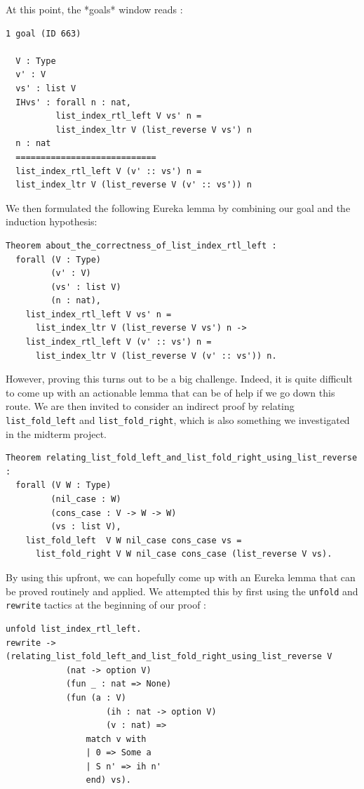 \documentclass{article}
\begin{document}
At this point, the *goals* window reads :

\begin{lstlisting}
1 goal (ID 663)
  
  V : Type
  v' : V
  vs' : list V
  IHvs' : forall n : nat,
          list_index_rtl_left V vs' n =
          list_index_ltr V (list_reverse V vs') n
  n : nat
  ============================
  list_index_rtl_left V (v' :: vs') n =
  list_index_ltr V (list_reverse V (v' :: vs')) n
\end{lstlisting}

We then formulated the following Eureka lemma by combining our goal and the induction hypothesis:

\begin{lstlisting}
Theorem about_the_correctness_of_list_index_rtl_left :
  forall (V : Type)
         (v' : V)
         (vs' : list V)
         (n : nat),
    list_index_rtl_left V vs' n =
      list_index_ltr V (list_reverse V vs') n ->
    list_index_rtl_left V (v' :: vs') n =
      list_index_ltr V (list_reverse V (v' :: vs')) n.
\end{lstlisting}

However, proving this turns out to be a big challenge. Indeed, it is quite difficult to come up with an actionable lemma that can be of help if we go down this route. We are then invited to consider an indirect proof by relating \texttt{list\_fold\_left} and \texttt{list\_fold\_right}, which is also something we investigated in the midterm project.

\begin{lstlisting}
Theorem relating_list_fold_left_and_list_fold_right_using_list_reverse :
  forall (V W : Type)
         (nil_case : W)
         (cons_case : V -> W -> W)
         (vs : list V),
    list_fold_left  V W nil_case cons_case vs =
      list_fold_right V W nil_case cons_case (list_reverse V vs).
\end{lstlisting}

By using this upfront, we can hopefully come up with an Eureka lemma that can be proved routinely and applied. We attempted this by first using the \texttt{unfold} and \texttt{rewrite} tactics at the beginning of our proof :

\begin{lstlisting}
unfold list_index_rtl_left.
rewrite -> (relating_list_fold_left_and_list_fold_right_using_list_reverse V
            (nat -> option V)
            (fun _ : nat => None)
            (fun (a : V)
                    (ih : nat -> option V)
                    (v : nat) =>
                match v with
                | 0 => Some a
                | S n' => ih n'
                end) vs).
\end{lstlisting}
\end{document}
